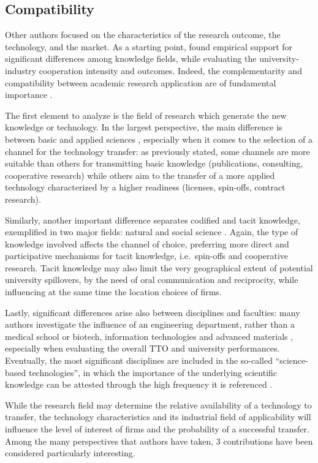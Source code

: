 \subsection{Compatibility}

Other authors focused on the characteristics of the research outcome, the technology, and the market. As a starting point, \citet{Tijssen2006} found empirical support for significant differences among knowledge fields, while evaluating the university-industry cooperation intensity and outcomes. Indeed, the complementarity and compatibility between academic research application are of fundamental importance \citep{Geuna2009}.

The first element to analyze is the field of research which generate the new knowledge or technology. In the largest perspective, the main difference is between basic and applied sciences \citep{DEste2007}, especially when it comes to the selection of a channel for the technology transfer: as previously stated, some channels are more suitable than others for transmitting basic knowledge (publications, consulting, cooperative research) while others aim to the transfer of a more applied technology characterized by a higher readiness (licenses, spin-offs, contract research).

Similarly, another important difference separates codified and tacit knowledge, exemplified in two major fields: natural and social science \citep{Audretsch2004}. Again, the type of knowledge involved affects the channel of choice, preferring more direct and participative mechanisms for tacit knowledge, i.e.\ spin-offs and cooperative research. Tacit knowledge may also limit the very geographical extent of potential university spillovers, by the need of oral communication and reciprocity, while influencing at the same time the location choices of firms.

Lastly, significant differences arise also between disciplines and faculties: many authors investigate the influence of an engineering department, rather than a medical school or biotech, information technologies and advanced materials \citep{DEste2007}, especially when evaluating the overall TTO and university performances. Eventually, the most significant disciplines are included in the so-called \enquote{science-based technologies}, in which the importance of the underlying scientific knowledge can be attested through the high frequency it is referenced \citep{Debackere2005}.

While the research field may determine the relative availability of a technology to transfer, the technology characteristics and its industrial field of applicability will influence the level of interest of firms and the probability of a successful transfer. Among the many perspectives that authors have taken, 3 contributions have been considered particularly interesting.

